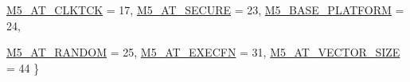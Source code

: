 \begin{DoxyCompactItemize}
\hyperlink{classLiveProcess_aeb4aa6d635512df433c7194b793c349aa3bc3a7ebce080954256c4c54ba8bc2f3}{M5\_\-AT\_\-CLKTCK} =  17, 
\hyperlink{classLiveProcess_aeb4aa6d635512df433c7194b793c349aa94e8f26f3de09fc99811055b35c06a8a}{M5\_\-AT\_\-SECURE} =  23, 
\hyperlink{classLiveProcess_aeb4aa6d635512df433c7194b793c349aaf3aaaec24b820caac6accfa66be583f0}{M5\_\-BASE\_\-PLATFORM} =  24, 
\par
\hyperlink{classLiveProcess_aeb4aa6d635512df433c7194b793c349aacd564c0fc8762d6f9d446e7302975eb9}{M5\_\-AT\_\-RANDOM} =  25, 
\hyperlink{classLiveProcess_aeb4aa6d635512df433c7194b793c349aabeb3769eab34dfa6cb33929d480b67ea}{M5\_\-AT\_\-EXECFN} =  31, 
\hyperlink{classLiveProcess_aeb4aa6d635512df433c7194b793c349aaf8fdb3a415697474e7de10bc30411646}{M5\_\-AT\_\-VECTOR\_\-SIZE} =  44
 \}
\end{DoxyCompactItemize}
